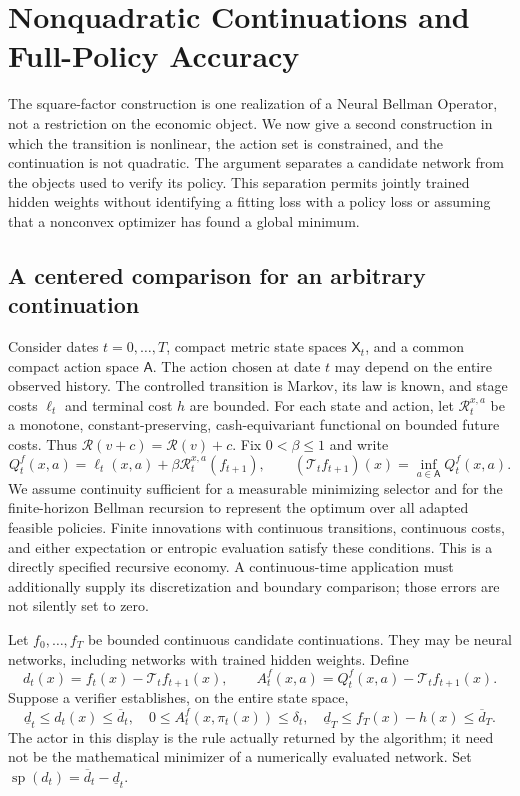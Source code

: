 \section{Nonquadratic Continuations and Full-Policy Accuracy}
\label{sec:r38nonlinear}
The square-factor construction is one realization of a Neural Bellman
Operator, not a restriction on the economic object. We now give a second
construction in which the transition is nonlinear, the action set is
constrained, and the continuation is not quadratic. The argument separates a
candidate network from the objects used to verify its policy. This separation
permits jointly trained hidden weights without identifying a fitting loss
with a policy loss or assuming that a nonconvex optimizer has found a global
minimum.

\subsection{A centered comparison for an arbitrary continuation}
Consider dates $t=0,\ldots,T$, compact metric state spaces $\mathsf X_t$, and
a common compact action space $\mathsf A$. The action chosen at date $t$ may
depend on the entire observed history. The controlled transition is Markov,
its law is known, and stage costs $\ell_t$ and terminal cost $h$ are bounded.
For each state and action, let $\mathcal R_t^{x,a}$ be a monotone,
constant-preserving, cash-equivariant functional on bounded future costs.
Thus $\mathcal R(v+c)=\mathcal R(v)+c$. Fix $0<\beta\leq1$ and write
\begin{equation}\label{eq:r38bellman}
 Q_t^f(x,a)=\ell_t(x,a)+\beta\mathcal R_t^{x,a}(f_{t+1}),\qquad
 (\mathcal T_t f_{t+1})(x)=\inf_{a\in\mathsf A}Q_t^f(x,a).
\end{equation}
We assume continuity sufficient for a measurable minimizing selector and for
the finite-horizon Bellman recursion to represent the optimum over all
adapted feasible policies. Finite innovations with continuous transitions,
continuous costs, and either expectation or entropic evaluation satisfy
these conditions. This is a directly specified recursive economy. A
continuous-time application must additionally supply its discretization and
boundary comparison; those errors are not silently set to zero.

Let $f_0,\ldots,f_T$ be bounded continuous candidate continuations. They may
be neural networks, including networks with trained hidden weights. Define
\[
 d_t(x)=f_t(x)-\mathcal T_t f_{t+1}(x),\qquad
 A_t^f(x,a)=Q_t^f(x,a)-\mathcal T_t f_{t+1}(x).
\]
Suppose a verifier establishes, on the entire state space,
\begin{equation}\label{eq:r38residual}
 \underline d_t\leq d_t(x)\leq\overline d_t,\quad
 0\leq A_t^f(x,\pi_t(x))\leq\delta_t,\quad
 \underline d_T\leq f_T(x)-h(x)\leq\overline d_T.
\end{equation}
The actor in this display is the rule actually returned by the algorithm;
it need not be the mathematical minimizer of a numerically evaluated
network. Set $\operatorname{sp}(d_t)=\overline d_t-\underline d_t$.

